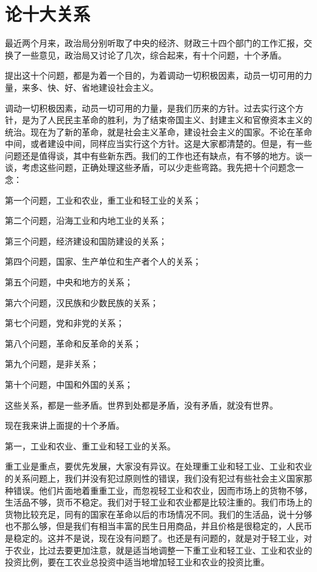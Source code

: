 \section[论十大关系（一九五六年四月二十五日）]{论十大关系}


最近两个月来，政治局分别听取了中央的经济、财政三十四个部门的工作汇报，交换了一些意见，政治局又讨论了几次，综合起来，有十个问题，十个矛盾。

提出这十个问题，都是为着一个目的，为着调动一切积极因素，动员一切可用的力量，来多、快、好、省地建设社会主义。

调动一切积极因素，动员一切可用的力量，是我们历来的方针。过去实行这个方针，是为了人民民主革命的胜利，为了结束帝国主义、封建主义和官僚资本主义的统治。现在为了新的革命，就是社会主义革命，建设社会主义的国家。不论在革命中间，或者建设中间，同样应当实行这个方针。这是大家都清楚的。但是，有一些问题还是值得谈，其中有些新东西。我们的工作也还有缺点，有不够的地方。谈一谈，考虑这些问题，正确处理这些矛盾，可以少走些弯路。我先把十个问题念一念：

第一个问题，工业和农业，重工业和轻工业的关系；

第二个问题，沿海工业和内地工业的关系；

第三个问题，经济建设和国防建设的关系；

第四个问题，国家、生产单位和生产者个人的关系；

第五个问题，中央和地方的关系；

第六个问题，汉民族和少数民族的关系；

第七个问题，党和非党的关系；

第八个问题，革命和反革命的关系；

第九个问题，是非关系；

第十个问题，中国和外国的关系；

这些关系，都是一些矛盾。世界到处都是矛盾，没有矛盾，就没有世界。

现在我来讲上面提的十个矛盾。

第一，工业和农业、重工业和轻工业的关系。

重工业是重点，要优先发展，大家没有异议。在处理重工业和轻工业、工业和农业的关系问题上，我们并没有犯过原则性的错误，我们没有犯过有些社会主义国家那种错误。他们片面地着重重工业，而忽视轻工业和农业，因而市场上的货物不够，生活品不够，货币不稳定。我们对于轻工业和农业都是比较注重的。我们市场上的货物比较充足，同有的国家在革命以后的市场情况不同。我们的生活品，说十分够也不那么够，但是我们有相当丰富的民生日用商品，并且价格是很稳定的，人民币是稳定的。这并不是说，现在没有问题了。也还是有问题的，就是对于轻工业，对于农业，比过去要更加注意，就是适当地调整一下重工业和轻工业、工业和农业的投资比例，要在工农业总投资中适当地增加轻工业和农业的投资比重。

